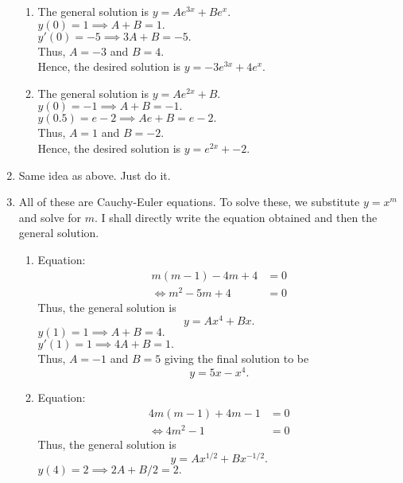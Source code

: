 \documentclass{article}
\begin{document}
\begin{enumerate}[label = Q.\arabic*.]
	\begin{enumerate}[label = (\roman*)] 
		\item The general solution is $y = Ae^{3x} + Be^x.$\\
		$y(0) = 1 \implies A + B = 1.$\\
		$y'(0) = -5 \implies 3A + B = -5.$\\
		Thus, $A = -3$ and $B = 4.$\\
		Hence, the desired solution is $y = -3e^{3x} + 4e^x.$
		\item The general solution is $y = Ae^{2x} + B.$\\
		$y(0) = -1 \implies A + B = -1.$\\
		$y(0.5) = e - 2 \implies Ae + B = e-2.$\\
		Thus, $A = 1$ and $B = -2.$\\
		Hence, the desired solution is $y = e^{2x} + -2.$
	\end{enumerate}
	\item Same idea as above. Just do it. \checkmark
	\item \label{q8} All of these are Cauchy-Euler equations. To solve these, we substitute $y = x^m$ and solve for $m.$ I shall directly write the equation obtained and then the general solution.
	\begin{enumerate}[label = (\roman*)] 
		\item Equation:
		\begin{align*} 
			m(m - 1) - 4m + 4 &= 0\\
			\iff m^2 - 5m + 4 &= 0
		\end{align*}
		Thus, the general solution is
		\begin{equation*} 
			y = Ax^4 + Bx.
		\end{equation*}
		$y(1) = 1 \implies A + B = 4.$\\
		$y'(1) = 1 \implies 4A + B = 1.$\\
		Thus, $A = -1$ and $B = 5$ giving the final solution to be
		\begin{equation*} 
			y = 5x -x^4.
		\end{equation*}
		\item Equation:
		\begin{align*} 
			4m(m - 1) + 4m - 1 &= 0\\
			\iff 4m^2 - 1 &= 0
		\end{align*}
		Thus, the general solution is
		\begin{equation*} 
			y = Ax^{1/2} + Bx^{-1/2}.
		\end{equation*}
		$y(4) = 2 \implies 2A + B/2 = 2.$\\

\end{enumerate}
\end{enumerate}
\end{document}
